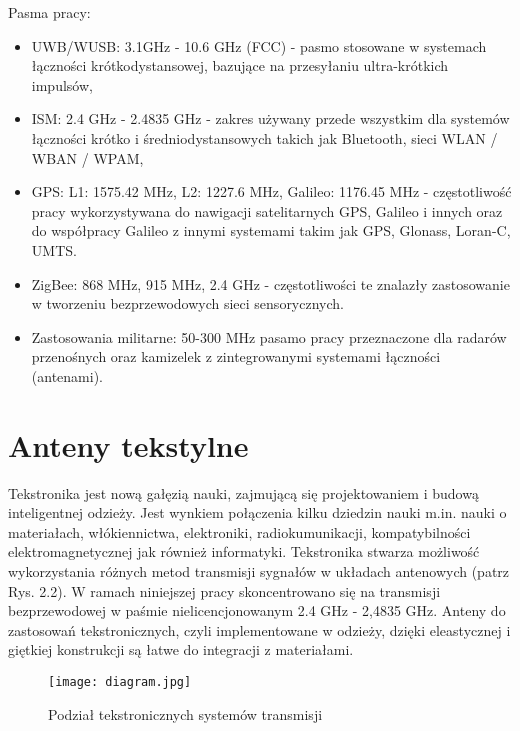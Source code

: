 \noindent Pasma pracy:

\begin{itemize}\setlength{\itemsep}{0pt}
	
	\item UWB/WUSB: 3.1GHz - 10.6 GHz (FCC) - pasmo stosowane w systemach łączności krótkodystansowej, bazujące na przesyłaniu ultra-krótkich impulsów,

	\item ISM: 2.4 GHz - 2.4835 GHz - zakres używany przede wszystkim dla systemów łączności krótko i średniodystansowych takich jak Bluetooth, sieci WLAN / WBAN / WPAM,

	\item GPS: L1: 1575.42 MHz, L2: 1227.6 MHz, Galileo: 1176.45 MHz - częstotliwość pracy wykorzystywana do nawigacji satelitarnych GPS, Galileo i innych oraz do współpracy Galileo z innymi systemami takim jak GPS, Glonass, Loran-C, UMTS.

	\item ZigBee: 868 MHz, 915 MHz, 2.4 GHz - częstotliwości te znalazły zastosowanie w tworzeniu bezprzewodowych sieci sensorycznych.

	\item Zastosowania militarne: 50-300 MHz pasamo pracy przeznaczone dla radarów przenośnych oraz kamizelek z zintegrowanymi systemami łączności (antenami).

\end{itemize}

\section{Anteny tekstylne}

Tekstronika jest nową gałęzią nauki, zajmującą się projektowaniem i budową inteligentnej odzieży. Jest wynkiem połączenia kilku dziedzin nauki m.in. nauki o materiałach, włókiennictwa, elektroniki, radiokumunikacji, kompatybilności elektromagnetycznej jak również informatyki. Tekstronika stwarza możliwość wykorzystania różnych metod transmisji sygnałów w układach antenowych (patrz Rys. 2.2). W ramach niniejszej pracy skoncentrowano się na transmisji bezprzewodowej w paśmie nielicencjonowanym 2.4 GHz - 2,4835 GHz.  
Anteny do zastosowań tekstronicznych, czyli implementowane w odzieży, dzięki eleastycznej i giętkiej konstrukcji są łatwe do integracji z materiałami.


\begin{figure}[h!]
	\centering
	    \texttt{[image: diagram.jpg]}
	    \caption{Podział tekstronicznych systemów transmisji}
\end{figure}


